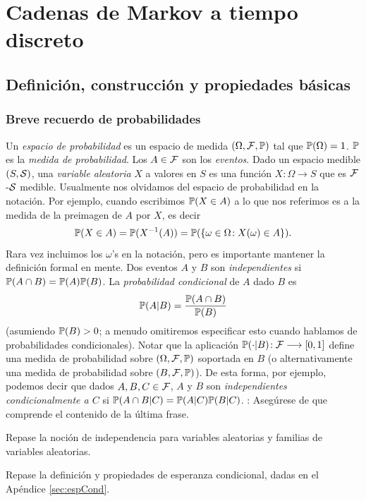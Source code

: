 
\section{Cadenas de Markov a tiempo discreto}

\subsection{Definición, construcción y propiedades básicas}

\subsubsection{Breve recuerdo de probabilidades}

Un \emph{espacio de probabilidad} es un espacio de medida $(\Omega,\mathcal{F},\mathbb{P})$ tal que $\mathbb{P}(\Omega)=1$.
$\mathbb{P}$ es la \emph{medida de probabilidad}.
Los $A\in\mathcal{F}$ son los \emph{eventos}.
\lsep
Dado un espacio medible $(S,\mathcal{S})$, una \emph{variable aleatoria} $X$ a valores en $S$ es una función $X\!:\Omega\longrightarrow S$ que es $\mathcal{F}$-$\mathcal{S}$ medible.
Usualmente nos olvidamos del espacio de probabilidad en la notación.
Por ejemplo, cuando escribimos $\mathbb{P}(X\in A)$ a lo que nos referimos es a la medida de la preimagen de $A$ por $X$, es decir
\[\mathbb{P}(X\in A)=\mathbb{P}(X^{-1}(A))=\mathbb{P}(\{\omega\in \Omega\!:X(\omega)\in A\}).\]
Rara vez incluimos los $\omega$'s en la notación, pero es importante mantener la definición formal en mente.
\lsep Dos eventos $A$ y $B$ son \emph{independientes} si $\mathbb{P}(A\cap B)=\mathbb{P}(A)\mathbb{P}(B)$.
La \emph{probabilidad condicional} de $A$ dado $B$ es
\[\mathbb{P}(A|B)=\frac{\mathbb{P}(A\cap B)}{\mathbb{P}(B)}\]
(asumiendo $\mathbb{P}(B)>0$; a menudo omitiremos especificar esto cuando hablamos de probabilidades condicionales).
\lsep
Notar que la aplicación $\mathbb{P}(\cdot|B)\!:\mathcal{F}\longrightarrow[0,1]$ define una medida de probabilidad sobre $(\Omega,\mathcal{F},\mathbb{P})$ soportada en $B$ (o alternativamente una medida de probabilidad sobre $(B,\mathcal{F},\mathbb{P})$).
De esta forma, por ejemplo, podemos decir que dados $A,B,C\in\mathcal{F}$, $A$ y $B$ son \emph{independientes condicionalmente a $C$} si $\mathbb{P}(A\cap B|C)=\mathbb{P}(A|C)\mathbb{P}(B|C)$.
\uexer: Asegúrese de que comprende el contenido de la última frase.

\begin{sqgnote}
Repase la noción de independencia para variables aleatorias y familias de variables aleatorias.
\end{sqgnote}
\begin{sqgnote}
Repase la definición y propiedades de esperanza condicional, dadas en el Apéndice \ref{sec:espCond}.
\end{sqgnote}


